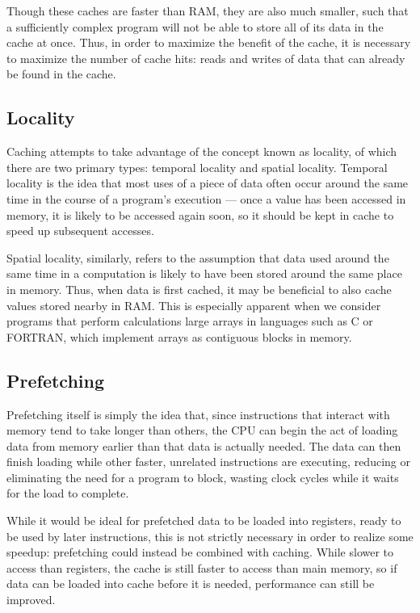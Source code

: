 \documentclass[journal]{IEEEtran}
\begin{document}
Though these caches are faster than RAM, they are also much smaller, such that a sufficiently complex program will not be able to store all of its data in the cache at once. Thus, in order to maximize the benefit of the cache, it is necessary to maximize the number of cache hits: reads and writes of data that can already be found in the cache.

\subsection{Locality}

Caching attempts to take advantage of the concept known as locality, of which there are two primary types: temporal locality and spatial locality. Temporal locality is the idea that most uses of a piece of data often occur around the same time in the course of a program's execution --- once a value has been accessed in memory, it is likely to be accessed again soon, so it should be kept in cache to speed up subsequent accesses.

Spatial locality, similarly, refers to the assumption that data used around the same time in a computation is likely to have been stored around the same place in memory. Thus, when data is first cached, it may be beneficial to also cache values stored nearby in RAM. This is especially apparent when we consider programs that perform calculations large arrays in languages such as C or FORTRAN, which implement arrays as contiguous blocks in memory.


\subsection{Prefetching}

Prefetching itself is simply the idea that, since instructions that interact with memory tend to take longer than others, the CPU can begin the act of loading data from memory earlier than that data is actually needed. The data can then finish loading while other faster, unrelated instructions are executing, reducing or eliminating the need for a program to block, wasting clock cycles while it waits for the load to complete.

While it would be ideal for prefetched data to be loaded into registers, ready to be used by later instructions, this is not strictly necessary in order to realize some speedup: prefetching could instead be combined with caching. While slower to access than registers, the cache is still faster to access than main memory, so if data can be loaded into cache before it is needed, performance can still be improved.
\end{document}
